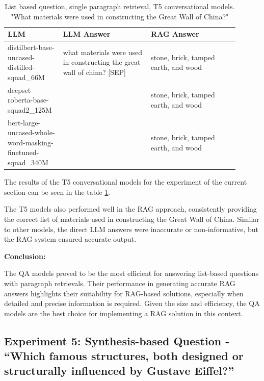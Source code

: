 \documentclass{wseas}
\begin{document}
\begin{table}[htbp]
  \centering
  \label{tab:experiment_R_1_paragraph_Q_listBased_M_T5Models_table}  %
  \caption{List based question, single paragraph retrieval, T5 conversational models. "What materials were used in constructing the Great Wall of China?"}
  \begin{tabular}{|p{0.20\linewidth}|p{0.35\linewidth}|p{0.35\linewidth}|}
    \hline
    \textbf{LLM} & \textbf{LLM Answer} & \textbf{RAG Answer} \\
    \hline
    distilbert-base-uncased-distilled-squad\_66M & what materials were used in constructing the great wall of china? {[}SEP{]} & stone, brick, tamped earth, and wood \\
    \hline
    deepset roberta-base-squad2\_125M & & stone, brick, tamped earth, and wood \\
    \hline
    bert-large-uncased-whole-word-masking-finetuned-squad\_340M & & stone, brick, tamped earth, and wood \\
    \hline
  \end{tabular}
\end{table}

The results of the T5 conversational models for the experiment of the
current section can be seen in the table \ref{tab:experiment_R_1_paragraph_Q_listBased_M_T5Models_table}.

The T5 models also performed well in the RAG approach, consistently
providing the correct list of materials used in constructing the Great
Wall of China. Similar to other models, the direct LLM answers were
inaccurate or non-informative, but the RAG system ensured accurate
output.

\textbf{Conclusion:}

The QA models proved to be the most efficient for answering list-based
questions with paragraph retrievals. Their performance in generating
accurate RAG answers highlights their suitability for RAG-based
solutions, especially when detailed and precise information is required.
Given the size and efficiency, the QA models are the best choice for
implementing a RAG solution in this context.


\subsection{Experiment 5: Synthesis-based Question - ``Which famous
structures, both designed or structurally influenced by Gustave
Eiffel?''}
\end{document}
